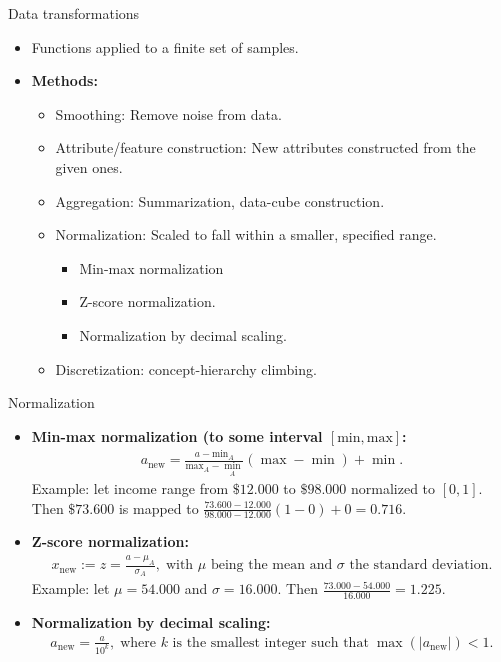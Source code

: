 \documentclass[aspectratio=169,t]{beamer}
\begin{document}
 {
    \begin{frame}{Data transformations}
    \begin{itemize}
      \item Functions applied to a finite set of samples.
      \item \textbf{Methods:}
      \begin{itemize}
        \item Smoothing: Remove noise from data.
        \item Attribute/feature construction: New attributes constructed from the given ones.
        \item Aggregation: Summarization, data-cube construction.
        \item Normalization: Scaled to fall within a smaller, specified range.
        \begin{itemize}
          \item Min-max normalization
          \item Z-score normalization.
          \item Normalization by decimal scaling.
        \end{itemize}
        \item Discretization: concept-hierarchy climbing.
      \end{itemize}
    \end{itemize}
    \end{frame}
  }

  {
    \begin{frame}{Normalization}
      \begin{itemize}
        \item \textbf{Min-max normalization (to some interval $[\text{min},\text{max}]$:}
        \begin{align}
          a_{\text{new}} = \frac{a - \text{min}_A}{\text{max}_A-\min_{A}} (\max - \min) + \min.
        \end{align}
        Example: let income range from $\$12.000$ to $\$98.000$ normalized to $[0,1]$.\\
        Then $\$73.600$ is mapped to $\frac{73.600-12.000}{98.000-12.000} (1-0) + 0 = 0.716$.
        \item \textbf{Z-score normalization:}
        \begin{align}
          x_{\text{new}} := z = \frac{a-\mu_{A}}{\sigma_A}, \; \text{with $\mu$ being the mean and $\sigma$ the standard deviation.}
        \end{align}
        Example: let $\mu = 54.000$ and $\sigma = 16.000$. Then $\frac{73.000-54.000}{16.000} = 1.225$.
        \item \textbf{Normalization by decimal scaling:}
        \begin{align}
        a_{\text{new}} = \frac{a}{10^k}, \; \text{where $k$ is the smallest integer such that} \; \max(\vert a_{\text{new}} \vert) < 1.
        \end{align}
      \end{itemize}
    \end{frame}
  }
\end{document}
